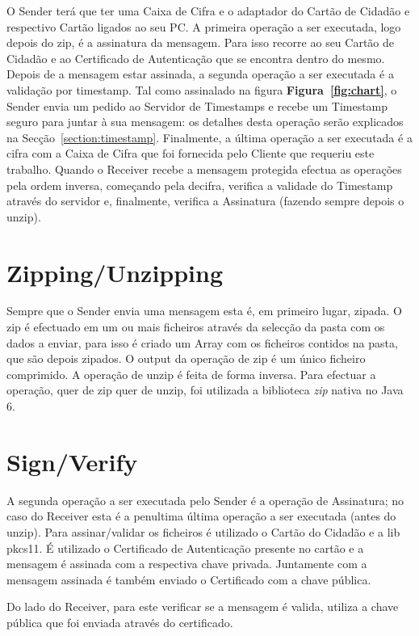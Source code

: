 O Sender terá que ter uma Caixa de Cifra e o adaptador do Cartão de Cidadão e respectivo Cartão ligados ao seu PC.
A primeira operação a ser executada, logo depois do zip, é a assinatura da mensagem. Para isso recorre ao seu Cartão de Cidadão e ao Certificado de Autenticação que se encontra dentro do mesmo.
Depois de a mensagem estar assinada, a segunda operação a ser executada é a validação por timestamp. Tal como assinalado na figura \textbf{Figura~\ref{fig:chart}}, o Sender envia um pedido ao Servidor de Timestamps e recebe um Timestamp seguro para juntar à sua mensagem: os detalhes desta operação serão explicados na Secção~\ref{section:timestamp}.
Finalmente, a última operação a ser executada é a cifra com a Caixa de Cifra que foi fornecida pelo Cliente que requeriu este trabalho.
Quando o Receiver recebe a mensagem protegida efectua as operações pela ordem inversa, começando pela decifra, verifica a validade do Timestamp através do servidor e, finalmente, verifica a Assinatura (fazendo sempre depois o unzip).

\section{Zipping/Unzipping}
Sempre que o Sender envia uma mensagem esta é, em primeiro lugar, zipada. 
O zip é efectuado em um ou mais ficheiros através da selecção da pasta com os dados a enviar, para isso é criado um Array com os ficheiros contidos na pasta, que são depois zipados.
O output da operação de zip é um único ficheiro comprimido.
A operação de unzip é feita de forma inversa.
Para efectuar a operação, quer de zip quer de unzip, foi utilizada a biblioteca \textit{zip} nativa no Java 6.

\section{Sign/Verify}
A segunda operação a ser executada pelo Sender é a operação de Assinatura; no caso do Receiver esta é a penultima última operação a ser executada (antes do unzip).
Para assinar/validar os ficheiros é utilizado o Cartão do Cidadão e a lib pkcs11.
É utilizado o Certificado de Autenticação presente no cartão e a mensagem é assinada com a respectiva chave privada. Juntamente com a mensagem assinada é também enviado o Certificado com a chave pública.

Do lado do Receiver, para este verificar se a mensagem é valida, utiliza a chave pública que foi enviada através do certificado.

